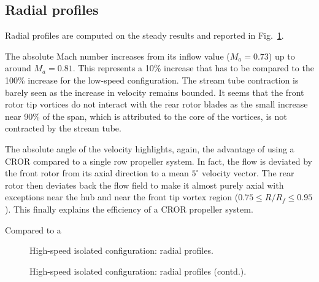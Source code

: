 \subsection{Radial profiles}
\label{sub:dream_hs_radial_profiles}

Radial profiles are computed on the steady results and 
reported in Fig.~\ref{fig:dream_HS_radial_profiles}.

The absolute Mach number increases from its inflow
value ($M_a = 0.73$) up to around $M_a=0.81$. This represents
a 10\% increase that has to be compared to the 100\% increase
for the low-speed configuration. The stream tube contraction
is barely seen as the increase in velocity remains bounded.
It seems that the front rotor tip vortices do not interact
with the rear rotor blades as the small increase near 90\%
of the span, which is attributed to the core of the vortices,
is not contracted by the stream tube.

The absolute angle of the velocity highlights, again, the advantage
of using a CROR compared to a single row propeller system. In fact,
the flow is deviated by the front rotor from its axial direction
to a mean $5^\circ$ velocity vector. The rear rotor then deviates
back the flow field to make it almost purely axial with exceptions
near the hub and near the front tip vortex region ($0.75 \leq R/R_f \leq 0.95$).
This finally explains the efficiency of a CROR propeller system.

Compared to a 

\begin{figure}[htp]
  \centering
  \caption{High-speed isolated configuration: radial profiles.}
\end{figure}
\begin{figure}[htp]
  \centering
  \setcounter{subfigure}{3}
  \caption{High-speed isolated configuration: radial profiles (contd.).}
  \label{fig:dream_HS_radial_profiles}
\end{figure}

